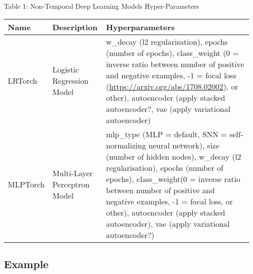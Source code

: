 \documentclass[]{article}
\begin{document}
Table 1: Non-Temporal Deep Learning Models Hyper-Parameters

\begin{longtable}[]{@{}lll@{}}
\toprule
\begin{minipage}[b]{0.11\columnwidth}\raggedright\strut
Name\strut
\end{minipage} & \begin{minipage}[b]{0.34\columnwidth}\raggedright\strut
Description\strut
\end{minipage} & \begin{minipage}[b]{0.46\columnwidth}\raggedright\strut
Hyperparameters\strut
\end{minipage}\tabularnewline
\midrule
\endhead
\begin{minipage}[t]{0.11\columnwidth}\raggedright\strut
LRTorch\strut
\end{minipage} & \begin{minipage}[t]{0.34\columnwidth}\raggedright\strut
Logistic Regression Model\strut
\end{minipage} & \begin{minipage}[t]{0.46\columnwidth}\raggedright\strut
w\_decay (l2 regularisation), epochs (number of epochs), class\_weight
(0 = inverse ratio between number of positive and negative examples, -1
= focal loss (\url{https://arxiv.org/abs/1708.02002}), or other),
autoencoder (apply stacked autoencoder?, vae (apply variational
autoencoder)\strut
\end{minipage}\tabularnewline
\begin{minipage}[t]{0.11\columnwidth}\raggedright\strut
MLPTorch\strut
\end{minipage} & \begin{minipage}[t]{0.34\columnwidth}\raggedright\strut
Multi-Layer Perceptron Model\strut
\end{minipage} & \begin{minipage}[t]{0.46\columnwidth}\raggedright\strut
mlp\_type (MLP = default, SNN = self-normalizing neural network), size
(number of hidden nodes), w\_decay (l2 regularisation), epochs (number
of epochs), class\_weight(0 = inverse ratio between number of positive
and negative examples, -1 = focal loss, or other), autoencoder (apply
stacked autoencoder), vae (apply variational autoencoder?)\strut
\end{minipage}\tabularnewline
\bottomrule
\end{longtable}

\subsection{Example}\label{example}
\end{document}
